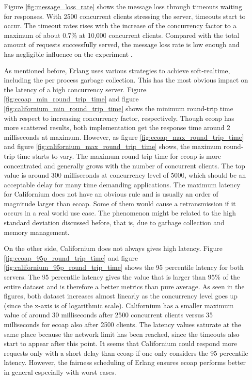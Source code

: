 Figure \ref{fig:message_loss_rate} shows the message loss through timeouts waiting for responses. With 2500 concurrent clients stressing the server, timeouts start to occur. The timeout rates rises with the increase of the concurrency factor to a maximum of about 0.7\% at 10,000 concurrent clients. Compared with the total amount of requests successfully served, the message loss rate is low enough and has negligible influence on the experiment . 

As mentioned before, Erlang uses various strategies to achieve soft-realtime, including the per process garbage collection. This has the most obvious impact on the latency of a high concurrency server. Figure \ref{fig:ecoap_min_round_trip_time} and figure \ref{fig:californium_min_round_trip_time} shows the minimum round-trip time with respect to increasing concurrency factor, respectively. Though ecoap has more scattered results, both implementation get the response time around 2 milliseconds at maximum. However, as figure \ref{fig:ecoap_max_round_trip_time} and figure \ref{fig:californium_max_round_trip_time} shows, the maximum round-trip time starts to vary.
The maximum round-trip time for ecoap is more concentrated and generally grows with the number of concurrent clients. The top value is around 300 milliseconds at concurrency level of 5000, which should be an acceptable delay for many time demanding applications. The maximum latency for Californium does not have an obvious rule and is usually an order of magnitude larger than ecoap. Some of them would cause a retransmission if it occurs in a real world use case. The phenomenon might be related to the high standard deviation discussed before, that is, due to garbage collection and memory management. 

On the other side, Californium does not always gives high latency. Figure \ref{fig:ecoap_95p_round_trip_time} and figure \ref{fig:californium_95p_round_trip_time} shows the 95 percentile latency for both servers. The 95 percentile latency gives the value that is larger than 95\% of the entire dataset and is therefore a better metrics than pure average. As seen in the figures, both dataset increases almost linearly as the concurrency level goes up (since the x-axis is of logarithmic scale). Californium has a smaller maximum value of around 30 milliseconds after 2500 concurrent clients versus 35 milliseconds for ecoap also after 2500 clients. The latency values saturate at the same place because the network limit has been reached, since the timeouts also start to appear after this point. It seems that Californium could respond more requests only with a short delay than ecoap if one only considers the 95 percentile latency. However, the fairness scheduling of Erlang ensures ecoap performs better in general especially with worst cases.

